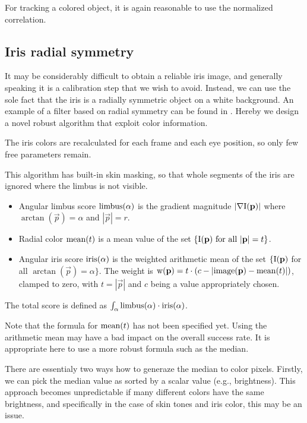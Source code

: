 For tracking a colored object, it is again reasonable to use the normalized correlation.

\subsection{Iris radial symmetry}

It may be considerably difficult to obtain a reliable iris image, and generally speaking it is a calibration step that we wish to avoid.
Instead, we can use the sole fact that the iris is a radially symmetric object on a white background.
An example of a filter based on radial symmetry can be found in \cite{leo14}.
Hereby we design a novel robust algorithm that exploit color information.

The iris colors are recalculated for each frame and each eye position, so only few free parameters remain.

This algorithm has built-in skin masking, so that whole segments of the iris are ignored where the limbus is not visible.

\begin{itemize}
\item
Angular limbus score $\mathrm{limbus}(\alpha)$ is the gradient magnitude $|\nabla \mathrm{I}(\mathbf{p})|$ where $\arctan(\vec p) = \alpha$ and $|\vec p| = r$.

\item
Radial color $\mathrm{mean}(t)$ is a mean value of the set $\{\mathrm{I}(\mathbf{p}) \text{ for all } |\mathbf{p}| = t \}$.

\item
Angular iris score $\mathrm{iris}(\alpha)$ is the weighted arithmetic mean of the set $\{\mathrm{I}(\mathbf{p})$ for all $\arctan(\vec p) = \alpha \}$.
The weight is $\mathrm{w}(\mathbf{p}) = t \cdot (c - |\mathrm{image}(\mathbf{p}) - \mathrm{mean}(t)|)$, clamped to zero, with $t = |\vec p|$ and $c$ being a value appropriately chosen.

\end{itemize}
The total score is defined as $\int_\alpha \mathrm{limbus}(\alpha) \cdot \mathrm{iris}(\alpha)$.

Note that the formula for $\mathrm{mean}(t)$ has not been specified yet.
Using the arithmetic mean may have a bad impact on the overall success rate.
It is appropriate here to use a more robust formula such as the median.

There are essentialy two ways how to generaze the median to color pixels.
Firstly, we can pick the median value as sorted by a scalar value (e.g., brightness).
This approach becomes unpredictable if many different colors have the same brightness, and specifically in the case of skin tones and iris color, this may be an issue.


